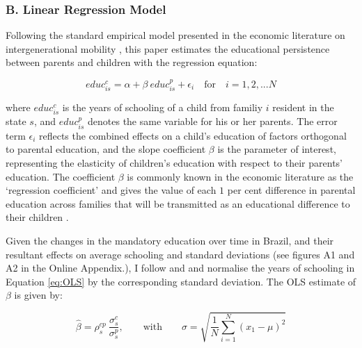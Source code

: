 \documentclass[a4paper, 12pt]{article}
\begin{document}





\subsubsection*{B. Linear Regression Model}

Following the standard empirical model presented in the economic literature on intergenerational mobility  \citep[see for example][]{hertz2007inheritance, black2010recent, blanden2013cross}, this paper estimates the educational persistence between parents and children with the regression equation:


\begin{equation} \label{eq:OLS}
educ^c_{is}=\alpha+\beta \: educ^p_{is}+\epsilon_i \quad \textrm{for} \quad i=1,2,...N
\end{equation}

where $educ^c_{is}$ is the years of schooling of a child from familiy $i$ resident in the state $s$, and $educ^p_{is}$ denotes the same variable for his or her parents. The error term $\epsilon_i$ reflects the combined effects on a child’s education of factors orthogonal to parental education, and the slope coefficient $\beta$ is the parameter of interest, representing the elasticity of children’s education with respect to their parents’ education. The coefficient $\beta$ is commonly known in the economic literature as the ‘regression coefficient’ and gives the value of each $1$ per cent difference in parental education across families that will be transmitted as an educational difference to their children \citep{blanden2013cross}.

Given the changes in the mandatory education over time in Brazil, and their resultant effects on average schooling and standard deviations (see figures A1 and A2 in the Online Appendix.), I follow \citet{ checchi2013intergenerational} and \citet{azam2016intergenerational} and normalise the years of schooling in Equation \eqref{eq:OLS} by the corresponding standard deviation. The OLS estimate of $\beta$ is given by:


\begin{equation} \label{eq:Beta}
\hat{\beta} = \rho_s^{cp} \: \frac{\sigma^c_s}{\sigma^p_s}, \qquad \textrm{with} \qquad \sigma=\sqrt{\frac{1}{N}\sum_{i=1}^{N}(x_1-\mu)^2}
\end{equation} 
\end{document}
